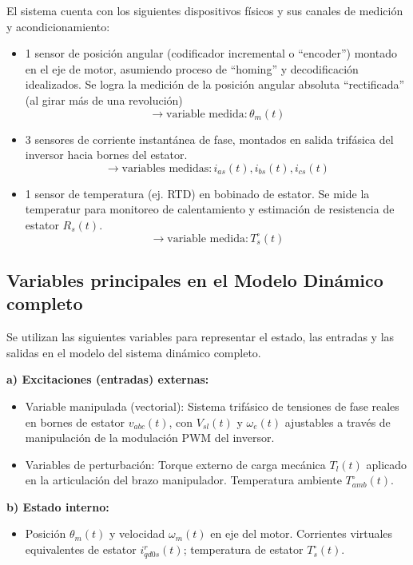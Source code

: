 \documentclass[a4paper, 10pt, onecolumn,journal]{ieeeconf}
\begin{document}
El sistema cuenta con los siguientes dispositivos físicos y sus canales de medición y acondicionamiento:
\begin{itemize}
    \item 1 sensor de posición angular (codificador incremental o “encoder”) montado en el eje de motor, asumiendo proceso de “homing” y decodificación idealizados. Se logra la medición de la posición angular absoluta “rectificada” (al girar más de una revolución)
    \[\rightarrow \text{variable medida}: \theta_m(t)\]
    \item 3 sensores de corriente instantánea de fase, montados en salida trifásica del inversor hacia bornes del estator.
    \[\rightarrow \text{variables medidas}: i_{as}(t), i_{bs}(t), i_{cs}(t)\]
    \item 1 sensor de temperatura (ej. RTD) en bobinado de estator. Se mide la temperatur para monitoreo de calentamiento y estimación de resistencia de estator $R_s(t)$.
    \[\rightarrow \text{variable medida}: T_s^{\circ}(t)\]
\end{itemize}

\subsection{\textbf{Variables principales en el Modelo Dinámico completo}}
Se utilizan las siguientes variables para representar el estado, las entradas y las salidas en el modelo del sistema dinámico completo.

\textbf{a) Excitaciones (entradas) externas:}
\begin{itemize}
    \item Variable manipulada (vectorial): Sistema trifásico de tensiones de fase reales en bornes de estator $v_{abc}(t)$, con $V_{sl}(t)$ y $\omega_e(t)$ ajustables a través de manipulación de la modulación PWM del inversor.
    \item Variables de perturbación: Torque externo de carga mecánica $T_l(t)$ aplicado en la articulación del brazo manipulador. Temperatura ambiente $T_{amb}^{\circ}(t)$.
\end{itemize}

\textbf{b) Estado interno:}
\begin{itemize}
    \item Posición $\theta_m(t)$ y velocidad $\omega_m(t)$ en eje del motor. Corrientes virtuales equivalentes de estator $i_{qd0s}^r(t)$; temperatura de estator $T_s^{\circ}(t)$.
\end{itemize}
\end{document}
